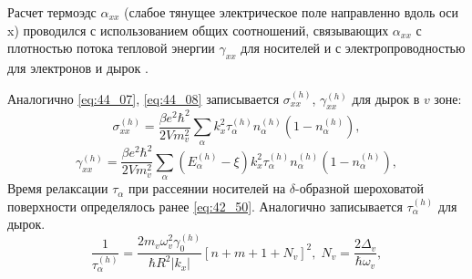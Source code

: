 Расчет термоэдс $\alpha_{xx} $ (слабое тянущее электрическое поле направленно вдоль оси x) проводился с использованием общих соотношений, связывающих $\alpha_{xx} $ с плотностью потока тепловой энергии $\gamma_{xx} $ для носителей и с электропроводностью для электронов и дырок \cite{Kubo1957}.

Аналогично \eqref{eq:44_07}, \eqref{eq:44_08} записывается $\sigma_{xx}^{(h)} $, $\gamma_{xx}^{(h)} $ для дырок в $v$ зоне:
\begin{equation} \label{eq:44_31_01}
\sigma_{xx}^{(h)} =\frac{\beta e^2 \hbar^2 }{2V m_v^2 } \sum_{\alpha }k_x^2 \tau_{\alpha }^{(h)} n^{(h)}_{\alpha } \left(1-n^{(h)}_{\alpha } \right),
\end{equation}
\begin{equation} \label{eq:44_31}
\gamma_{xx}^{(h)} =\frac{\beta e^2 \hbar^2 }{2 V m_v^2 } \sum _{\alpha }\left(E_{\alpha }^{(h)} -\xi \right)k_x^2 \tau _{\alpha }^{(h)} n^{(h)}_{\alpha } \left(1-n^{(h)}_{\alpha } \right) ,
\end{equation}
Время релаксации $\tau_\alpha $ при рассеянии носителей на $\delta $-образной шероховатой поверхности определялось ранее \eqref{eq:42_50}. Аналогично записывается $\tau_{\alpha }^{(h)} $ для дырок. 
\begin{equation} \label{eq:44_40}
\frac{1}{\tau_{\alpha }^{(h)} } =\frac{2m_v \omega_v^2 \gamma_0^{(h)} }{\hbar R^2 \left| k_x \right|} \left[n+m+1+N_v \right]^2, \; N_v =\frac{2 \Delta_v }{\hbar \omega_v} ,
\end{equation} 

